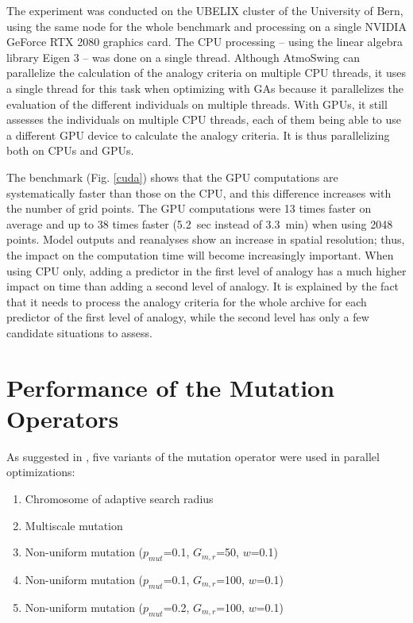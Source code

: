 \documentclass[draft]{agujournal2019}
\begin{document}
The experiment was conducted on the UBELIX cluster of the University of Bern, using the same node for the whole benchmark and processing on a single NVIDIA GeForce RTX 2080 graphics card. The CPU processing -- using the linear algebra library Eigen 3 \cite{Guennebaud2010} -- was done on a single thread. Although AtmoSwing can parallelize the calculation of the analogy criteria on multiple CPU threads, it uses a single thread for this task when optimizing with GAs because it parallelizes the evaluation of the different individuals on multiple threads. With GPUs, it still assesses the individuals on multiple CPU threads, each of them being able to use a different GPU device to calculate the analogy criteria. It is thus parallelizing both on CPUs and GPUs.

The benchmark (Fig. \ref{cuda}) shows that the GPU computations are systematically faster than those on the CPU, and this difference increases with the number of grid points. The GPU computations were 13 times faster on average and up to 38 times faster (5.2~sec instead of 3.3~min) when using 2048 points. Model outputs and reanalyses show an increase in spatial resolution; thus, the impact on the computation time will become increasingly important. When using CPU only, adding a predictor in the first level of analogy has a much higher impact on time than adding a second level of analogy. It is explained by the fact that it needs to process the analogy criteria for the whole archive for each predictor of the first level of analogy, while the second level has only a few candidate situations to assess.



\section{Performance of the Mutation Operators}

As suggested in , five variants of the mutation operator were used in parallel optimizations:

\begin{enumerate}
	\item Chromosome of adaptive search radius \cite{Horton2017a}
	\item Multiscale mutation \cite{Horton2017a}
	\item Non-uniform mutation ($p_{mut}$=0.1, $G_{m,r}$=50, $w$=0.1)
	\item Non-uniform mutation ($p_{mut}$=0.1, $G_{m,r}$=100, $w$=0.1)
	\item Non-uniform mutation ($p_{mut}$=0.2, $G_{m,r}$=100, $w$=0.1)
\end{enumerate}
\end{document}

